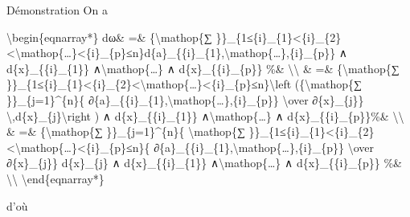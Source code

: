 \documentclass[]{article}
\begin{document}
Démonstration On a

\textbackslash{}begin\{eqnarray*\} dω\& =\& \{\textbackslash{}mathop\{∑
\}\}\_\{1≤\{i\}\_\{1\}\textless{}\{i\}\_\{2\}\textless{}\textbackslash{}mathop\{\ldots{}\}\textless{}\{i\}\_\{p\}≤n\}d\{a\}\_\{\{i\}\_\{1\},\textbackslash{}mathop\{\ldots{}\},\{i\}\_\{p\}\}
∧ d\{x\}\_\{\{i\}\_\{1\}\} ∧\textbackslash{}mathop\{\ldots{}\} ∧
d\{x\}\_\{\{i\}\_\{p\}\} \%\& \textbackslash{}\textbackslash{} \& =\&
\{\textbackslash{}mathop\{∑
\}\}\_\{1≤\{i\}\_\{1\}\textless{}\{i\}\_\{2\}\textless{}\textbackslash{}mathop\{\ldots{}\}\textless{}\{i\}\_\{p\}≤n\}\textbackslash{}left
(\{\textbackslash{}mathop\{∑ \}\}\_\{j=1\}\^{}\{n\}\{
∂\{a\}\_\{\{i\}\_\{1\},\textbackslash{}mathop\{\ldots{}\},\{i\}\_\{p\}\}
\textbackslash{}over ∂\{x\}\_\{j\}\}
\textbackslash{},d\{x\}\_\{j\}\textbackslash{}right ) ∧
d\{x\}\_\{\{i\}\_\{1\}\} ∧\textbackslash{}mathop\{\ldots{}\} ∧
d\{x\}\_\{\{i\}\_\{p\}\}\%\& \textbackslash{}\textbackslash{} \& =\&
\{\textbackslash{}mathop\{∑ \}\}\_\{j=1\}\^{}\{n\}\{
\textbackslash{}mathop\{∑
\}\}\_\{1≤\{i\}\_\{1\}\textless{}\{i\}\_\{2\}\textless{}\textbackslash{}mathop\{\ldots{}\}\textless{}\{i\}\_\{p\}≤n\}\{
∂\{a\}\_\{\{i\}\_\{1\},\textbackslash{}mathop\{\ldots{}\},\{i\}\_\{p\}\}
\textbackslash{}over ∂\{x\}\_\{j\}\} d\{x\}\_\{j\} ∧
d\{x\}\_\{\{i\}\_\{1\}\} ∧\textbackslash{}mathop\{\ldots{}\} ∧
d\{x\}\_\{\{i\}\_\{p\}\} \%\& \textbackslash{}\textbackslash{}
\textbackslash{}end\{eqnarray*\}

d'où
\end{document}
